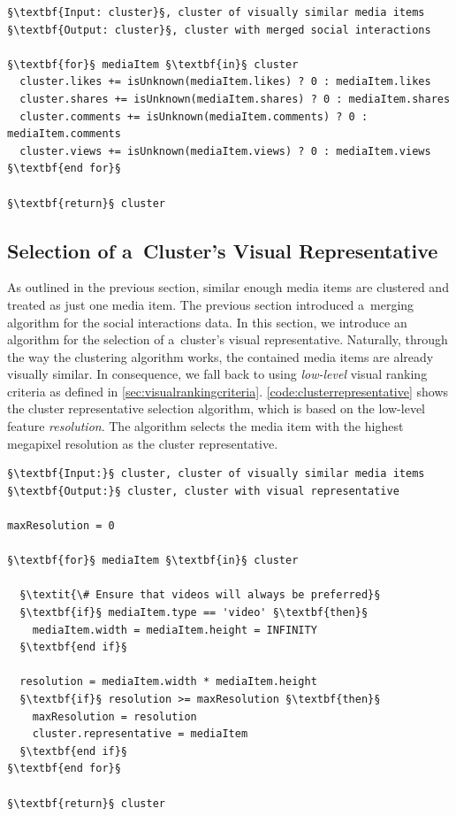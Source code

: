 \begin{lstlisting}[caption=The social interactions merging algorithm,
  label=code:merging, float=b!, escapechar=§]
§\textbf{Input: cluster}§, cluster of visually similar media items 
§\textbf{Output: cluster}§, cluster with merged social interactions 

§\textbf{for}§ mediaItem §\textbf{in}§ cluster
  cluster.likes += isUnknown(mediaItem.likes) ? 0 : mediaItem.likes
  cluster.shares += isUnknown(mediaItem.shares) ? 0 : mediaItem.shares
  cluster.comments += isUnknown(mediaItem.comments) ? 0 : mediaItem.comments
  cluster.views += isUnknown(mediaItem.views) ? 0 : mediaItem.views
§\textbf{end for}§

§\textbf{return}§ cluster
\end{lstlisting}

\subsection{Selection of a~Cluster's Visual Representative}  

As outlined in the previous section, similar enough media items
are clustered and treated as just one media item.
The previous section introduced
a~merging algorithm for the social interactions data.
In this section, we introduce an algorithm for the selection of
a~cluster's visual representative.
Naturally, through the way the clustering algorithm works,
the contained media items are already visually similar. 
In consequence, we fall back to using \emph{low-level}
visual ranking criteria as defined in \autoref{sec:visualrankingcriteria}.
\autoref{code:clusterrepresentative} shows the cluster representative
selection algorithm, which is based on the low-level feature \emph{resolution}.
The algorithm selects the media item with the highest megapixel resolution
as the cluster representative.

\begin{lstlisting}[caption=Pseudocode of the cluster visual representative selection algorithm that finds the highest quality media item of a~cluster,
  label=code:clusterrepresentative, float, escapechar=§]
§\textbf{Input:}§ cluster, cluster of visually similar media items
§\textbf{Output:}§ cluster, cluster with visual representative
  
maxResolution = 0

§\textbf{for}§ mediaItem §\textbf{in}§ cluster
  
  §\textit{\# Ensure that videos will always be preferred}§  
  §\textbf{if}§ mediaItem.type == 'video' §\textbf{then}§
    mediaItem.width = mediaItem.height = INFINITY
  §\textbf{end if}§ 
    
  resolution = mediaItem.width * mediaItem.height
  §\textbf{if}§ resolution >= maxResolution §\textbf{then}§
    maxResolution = resolution
    cluster.representative = mediaItem
  §\textbf{end if}§  
§\textbf{end for}§

§\textbf{return}§ cluster     
\end{lstlisting}

